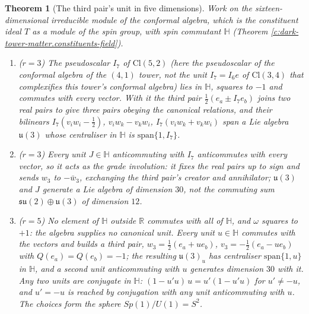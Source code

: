 \documentclass[11pt]{article}
\newtheorem{theorem}{Theorem}[section]
\theoremstyle{definition}
\theoremstyle{plain}
\newcommand{\changedmark}[2]{\marginpar{\raggedright\scriptsize\color{#1}#2}}
\providecommand{\Cl}{}\renewcommand{\Cl}{\mathrm{Cl}}
\providecommand{\HH}{}\renewcommand{\HH}{\mathbb{H}}
\providecommand{\R}{}\renewcommand{\R}{\mathbb{R}}
\providecommand{\su}{}\renewcommand{\su}{\mathfrak{su}}
\providecommand{\uu}{}\renewcommand{\uu}{\mathfrak{u}}
\begin{document}
\begin{theorem}[The third pair's unit in five dimensions]\label{c:dark-tower-matter.third-pairs-unit-five-dimensions}
\changedmark{BurntOrange}{changed since the deposit}
Work on the sixteen-dimensional irreducible module of the conformal algebra, which is the constituent ideal $T$ as a module of the spin group, with spin commutant $\HH$ (Theorem \ref{c:dark-tower-matter.constituents-field}).
\begin{enumerate}
\item[(i)] ($r = 3$) The pseudoscalar $I_{7}$ of $\Cl(5,2)$ (here the pseudoscalar of the conformal algebra of the $(4,1)$ tower, not the unit $I_{7} = I_{6}e$ of $\Cl(3,4)$ that complexifies this tower's conformal algebra) lies in $\HH$, squares to $-1$ and commutes with every vector. With it the third pair $\tfrac{1}{2}(e_{a} \pm I_{7}e_{b})$ joins two real pairs to give three pairs obeying the canonical relations, and their bilinears $I_{7}(v_{i}w_{i} - \tfrac{1}{2})$, $v_{i}w_{k} - v_{k}w_{i}$, $I_{7}(v_{i}w_{k} + v_{k}w_{i})$ span a Lie algebra $\uu(3)$ whose centraliser in $\HH$ is $\mathrm{span}\{1, I_{7}\}$.
\item[(ii)] ($r = 3$) Every unit $J \in \HH$ anticommuting with $I_{7}$ anticommutes with every vector, so it acts as the grade involution: it fixes the real pairs up to sign and sends $w_{3}$ to $-\bar{w}_{3}$, exchanging the third pair's creator and annihilator; $\uu(3)$ and $J$ generate a Lie algebra of dimension $30$, not the commuting sum $\su(2) \oplus \uu(3)$ of dimension $12$.
\item[(iii)] ($r = 5$) No element of $\HH$ outside $\R$ commutes with all of $\HH$, and $\omega$ squares to $+1$: the algebra supplies no canonical unit. Every unit $u \in \HH$ commutes with the vectors and builds a third pair, $w_{3} = \tfrac{1}{2}(e_{a} + ue_{b})$, $v_{3} = -\tfrac{1}{2}(e_{a} - ue_{b})$ with $Q(e_{a}) = Q(e_{b}) = -1$; the resulting $\uu(3)_{u}$ has centraliser $\mathrm{span}\{1, u\}$ in $\HH$, and a second unit anticommuting with $u$ generates dimension $30$ with it. Any two units are conjugate in $\HH$: $(1 - u'u)\,u = u'(1 - u'u)$ for $u' \neq -u$, and $u' = -u$ is reached by conjugation with any unit anticommuting with $u$. The choices form the sphere $Sp(1)/U(1) = S^{2}$.
\end{enumerate}
\end{theorem}
\end{document}
